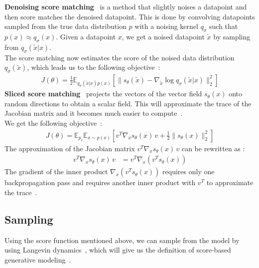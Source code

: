 \documentclass{article}
\numberwithin{equation}{section}
\numberwithin{figure}{section}
\begin{document}
\textbf{Denoising score matching}~\cite{vincent2010denoising} is a method that slightly noises a datapoint and then score matches the denoised datapoint. This is done by convolving datapoints sampled from the true data distribution $p$ with a noising kernel $q_\sigma$ such that $p(x) \approx q_\sigma (x)$. Given a datapoint $x$, we get a noised datapoint $\tilde{x}$ by sampling from $q_\sigma(\tilde{x} | x)$. \\
The score matching now estimates the score of the noised data distribution $q_\sigma(\tilde{x})$, which leads us to the following objective~\cite{song2020generative, vincent2010denoising}:
\begin{align}
  J(\theta) = \frac{1}{2} \mathbb{E}_{q_\sigma(\tilde{x} | x) p(x)} \left[ \| s_\theta (\tilde{x}) - \nabla_{\tilde{x}} \log q_\sigma(\tilde{x} | x) \|_2^2 \right]
\end{align}
\textbf{Sliced score matching}~\cite{song2019sliced} projects the vectors of the vector field $s_\theta (x)$ onto random directions to obtain a scalar field. This will approximate the trace of the Jacobian matrix and it becomes much easier to compute~\cite{song2020generative}. \\
We get the following objective~\cite{song2019sliced}:
\begin{align}
  J(\theta) = \mathbb{E}_{p_v} \mathbb{E}_{x \sim p(x)} \left[ v^T \nabla_x s_\theta (x) \, v + \frac{1}{2} \| s_\theta (x) \|_2^2 \right]
\end{align}
The approximation of the Jacobian matrix $v^T \nabla_x s_\theta (x) \, v$ can be rewritten as \cite{song2019sliced}:
\begin{align}
  v^T \nabla_x s_\theta (x) \, v &= v^T \nabla_x (v^T s_\theta (x))
\end{align}
The gradient of the inner product $\nabla_x (v^T s_\theta (x))$ requires only one backpropagation pass and requires another inner product with $v^T$ to approximate the trace~\cite{song2019sliced}.

\subsection{Sampling}
Using the score function mentioned above, we can sample from the model by using Langevin dynamics~\cite{song2020generative, WelTeh2011a}, which will give us the definition of score-based generative modeling~\cite{song2020generative}.
\end{document}
